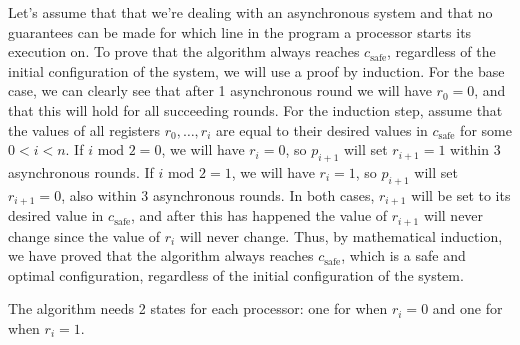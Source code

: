 \documentclass{article}
\begin{document}
Let's assume that that we're dealing with an asynchronous system and that no guarantees can be made for which line in the program a processor starts its execution on. To prove that the algorithm always reaches $c_{\text{safe}}$, regardless of the initial configuration of the system, we will use a proof by induction. For the base case, we can clearly see that after 1 asynchronous round we will have $r_0 = 0$, and that this will hold for all succeeding rounds. For the induction step, assume that the values of all registers $r_0, \ldots, r_i$ are equal to their desired values in $c_{\text{safe}}$ for some $0 < i < n$. If $i \text{ mod } 2 = 0$, we will have $r_i = 0$, so $p_{i+1}$ will set $r_{i+1} = 1$ within 3 asynchronous rounds. If $i \text{ mod } 2 = 1$, we will have $r_i = 1$, so $p_{i+1}$ will set $r_{i+1} = 0$, also within 3 asynchronous rounds. In both cases, $r_{i+1}$ will be set to its desired value in $c_{\text{safe}}$, and after this has happened the value of $r_{i+1}$ will never change since the value of $r_i$ will never change. Thus, by mathematical induction, we have proved that the algorithm always reaches $c_{\text{safe}}$, which is a safe and optimal configuration, regardless of the initial configuration of the system.

The algorithm needs 2 states for each processor: one for when $r_i = 0$ and one for when $r_i = 1$.
\end{document}
